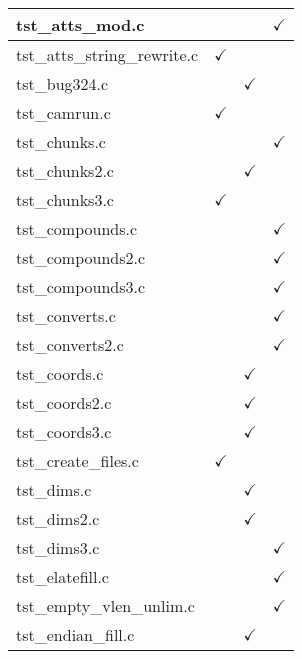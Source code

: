 \begin{table}[H]
\begin{tabular}{|l|c|c|c|}
tst\_atts\_mod.c        &               &               & $\checkmark$  \\ \hline
tst\_atts\_string\_rewrite.c & $\checkmark$ &           &               \\ \hline
tst\_bug324.c           &               & $\checkmark$  &               \\ \hline
tst\_camrun.c           & $\checkmark$  &               &               \\ \hline
tst\_chunks.c           &               &               & $\checkmark$  \\ \hline
tst\_chunks2.c          &               & $\checkmark$  &               \\ \hline
tst\_chunks3.c          & $\checkmark$  &               &               \\ \hline
tst\_compounds.c        &               &               & $\checkmark$  \\ \hline
tst\_compounds2.c       &               &               & $\checkmark$  \\ \hline
tst\_compounds3.c       &               &               & $\checkmark$  \\ \hline
tst\_converts.c         &               &               & $\checkmark$  \\ \hline
tst\_converts2.c        &               &               & $\checkmark$  \\ \hline
tst\_coords.c           &               & $\checkmark$  &               \\ \hline
tst\_coords2.c          &               & $\checkmark$  &               \\ \hline
tst\_coords3.c          &               & $\checkmark$  &               \\ \hline
tst\_create\_files.c    & $\checkmark$  &               &               \\ \hline
tst\_dims.c             &               & $\checkmark$  &               \\ \hline
tst\_dims2.c            &               & $\checkmark$  &               \\ \hline
tst\_dims3.c            &               &               & $\checkmark$  \\ \hline
tst\_elatefill.c        &               &               & $\checkmark$  \\ \hline
tst\_empty\_vlen\_unlim.c   &           &               & $\checkmark$  \\ \hline
tst\_endian\_fill.c     &               & $\checkmark$  &               \\ \hline

\end{tabular}
\end{table}
